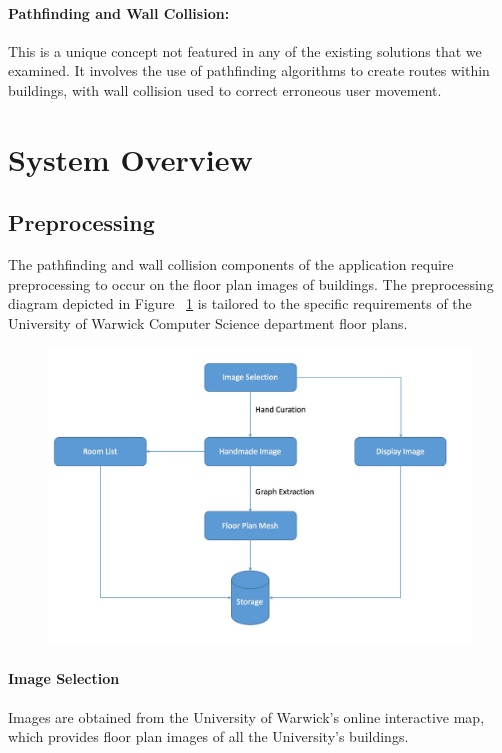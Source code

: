 \documentclass[12pt,a4paper]{report}
\begin{document}
\paragraph{Pathfinding and Wall Collision:}
This is a unique concept not featured in any of the existing solutions that we examined. It involves the use of pathfinding algorithms to create routes within buildings, with wall collision used to correct erroneous user movement. 

\section{System Overview}

\subsection{Preprocessing}

The pathfinding and wall collision components of the application require preprocessing to occur on the floor plan images of buildings. The preprocessing diagram depicted in Figure ~\ref{fig:preFlow} is tailored to the specific requirements of the University of Warwick Computer Science department floor plans.

\begin{figure}[h]
\includegraphics[width=\textwidth]{images/preFlow.png}
\label{fig:preFlow}
\end{figure}

\paragraph{Image Selection}
Images are obtained from the University of Warwick's online interactive map, which provides floor plan images of all the University's buildings.
\end{document}
